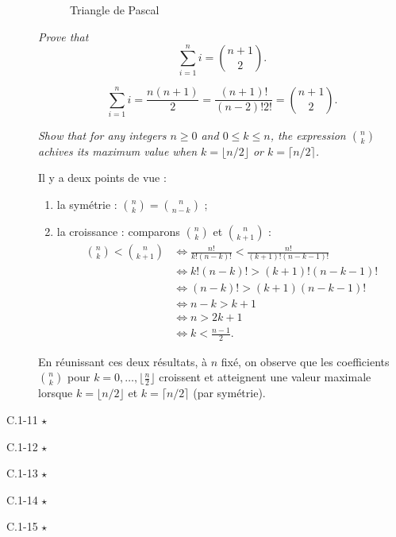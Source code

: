 \begin{description}
\begin{ex}
\begin{figure}[H]
        \caption{Triangle de Pascal}
        \label{fig:}
      \end{figure}
    \end{ex}
   {\itshape Prove that \[ \sum_{i=1}^n i = \binom{n+1}{2}.\]}
    \begin{ex}
      \[\sum_{i=1}^ni = \frac{n(n+1)}{2} = \frac{(n+1)!}{(n-2)!2!} = \binom{n+1}{2}.\]
    \end{ex}
   {\itshape Show that for any integers $n \ge 0$ and $ 0\le k \le n$, the expression $\binom{n}{k}$ achives its maximum value when $k = \lfloor n/2 \rfloor$ or $k = \lceil n/2 \rceil$.}
    \begin{ex}
      Il y a deux points de vue :
      \begin{enumerate}
        \item la sym\'etrie : $\binom{n}{k} = \binom{n}{n-k}$ ;
        \item la croissance :
        comparons $\binom{n}{k}$ et $\binom{n}{k+1}$ : 
        \begin{align*}
          \binom{n}{k} < \binom{n}{k+1} &\iff \frac{n!}{k!(n-k)!} < \frac{n!}{(k+1)!(n-k-1)!}\\
          &\iff k!(n-k)! > (k+1)!(n-k-1)!\\
          &\iff (n-k)! > (k+1)(n-k-1)!\\
          &\iff n-k>k+1\\
          &\iff n > 2k+1\\
          &\iff k<\frac{n-1}{2}.
        \end{align*}
      \end{enumerate}
      En r\'eunissant ces deux r\'esultats, \`a $n$ fix\'e, on observe que les coefficients $\binom{n}{k}$ pour $k = 0, \ldots, \lfloor \frac{n}{2} \rfloor$ croissent et atteignent une valeur maximale lorsque $k = \lfloor n/2 \rfloor$ et $ k = \lceil n/2 \rceil$ (par sym\'etrie).
    \end{ex}

  \item[C.1-11 $\star$] {\itshape }
  \item[C.1-12 $\star$] {\itshape }
  \item[C.1-13 $\star$] {\itshape }
  \item[C.1-14 $\star$] {\itshape }
  \item[C.1-15 $\star$] {\itshape }
\end{description}
